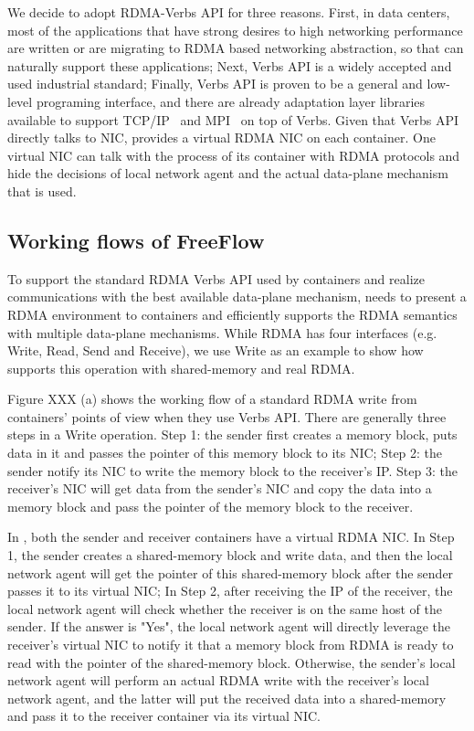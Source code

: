  We decide to adopt 
RDMA-Verbs API for three reasons. First, in data centers, most of
the applications that have strong desires to high networking performance
are written or are migrating to RDMA based networking abstraction, so that
\sysname can naturally support these applications; Next, Verbs API is a 
widely accepted and used industrial standard; Finally, Verbs API is proven
to be a general and low-level programing interface, and there are already
adaptation layer libraries available to support TCP/IP~\cite{?}
and MPI~\cite{?} on top of Verbs. Given that Verbs API directly talks to
NIC, \sysname provides a virtual RDMA NIC on each container. One virtual NIC
can talk with the process of its container with RDMA protocols and hide
the decisions of local network agent and the actual data-plane mechanism
that is used. 

\subsection{Working flows of FreeFlow}

To support the standard RDMA Verbs API used by containers and realize
communications with the best available data-plane mechanism, \sysname needs
to present a RDMA environment to containers and efficiently supports 
the RDMA semantics with multiple data-plane mechanisms. While RDMA has
four interfaces (e.g. Write, Read, Send and Receive), we use Write as an example
to show how \sysname supports this operation with shared-memory and real RDMA.

Figure XXX (a) shows the working flow of a standard RDMA write from containers'
points of view when they use Verbs API. There are generally three steps in a 
Write operation. 
Step 1: the sender first creates a memory block, puts data in it and passes 
the pointer of this memory block to its NIC;
Step 2: the sender notify its NIC to write the memory block to the receiver's IP.
Step 3: the receiver's NIC will get data from the sender's NIC and copy the 
data into a memory block and pass the pointer of the memory block to the 
receiver.

In \sysname, both the sender and receiver containers have a virtual RDMA NIC.
In Step 1, the sender creates a shared-memory block and write data, and then 
the local network agent will get the pointer of this shared-memory block after the sender passes it to its virtual NIC; In Step 2, after receiving the IP of 
the receiver, the local network agent will check whether the receiver is on
the same host of the sender. If the answer is "Yes", the local network agent will
directly leverage the receiver's virtual NIC to notify it that a memory block 
from RDMA is ready to read with the pointer of the shared-memory block. 
Otherwise, the sender's local network agent will perform an actual RDMA write
with the receiver's local network agent, and the latter will put the received data into a shared-memory and pass it to the receiver container via its virtual NIC.







